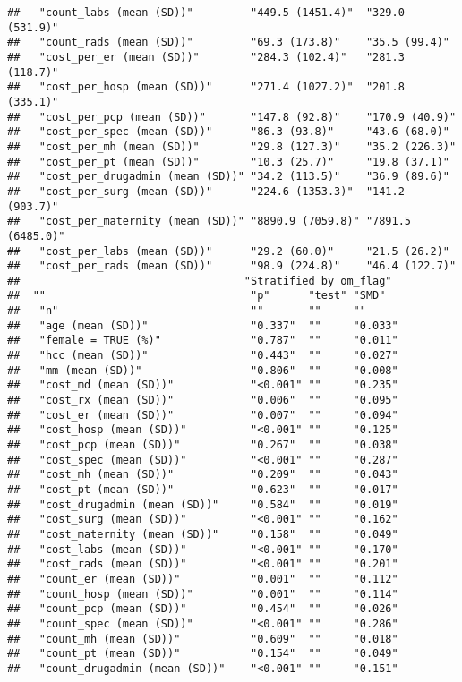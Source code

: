\documentclass[]{article}
\begin{document}
\begin{verbatim}
##   "count_labs (mean (SD))"         "449.5 (1451.4)"  "329.0 (531.9)"  
##   "count_rads (mean (SD))"         "69.3 (173.8)"    "35.5 (99.4)"    
##   "cost_per_er (mean (SD))"        "284.3 (102.4)"   "281.3 (118.7)"  
##   "cost_per_hosp (mean (SD))"      "271.4 (1027.2)"  "201.8 (335.1)"  
##   "cost_per_pcp (mean (SD))"       "147.8 (92.8)"    "170.9 (40.9)"   
##   "cost_per_spec (mean (SD))"      "86.3 (93.8)"     "43.6 (68.0)"    
##   "cost_per_mh (mean (SD))"        "29.8 (127.3)"    "35.2 (226.3)"   
##   "cost_per_pt (mean (SD))"        "10.3 (25.7)"     "19.8 (37.1)"    
##   "cost_per_drugadmin (mean (SD))" "34.2 (113.5)"    "36.9 (89.6)"    
##   "cost_per_surg (mean (SD))"      "224.6 (1353.3)"  "141.2 (903.7)"  
##   "cost_per_maternity (mean (SD))" "8890.9 (7059.8)" "7891.5 (6485.0)"
##   "cost_per_labs (mean (SD))"      "29.2 (60.0)"     "21.5 (26.2)"    
##   "cost_per_rads (mean (SD))"      "98.9 (224.8)"    "46.4 (122.7)"   
##                                   "Stratified by om_flag"
##  ""                                "p"      "test" "SMD"  
##   "n"                              ""       ""     ""     
##   "age (mean (SD))"                "0.337"  ""     "0.033"
##   "female = TRUE (%)"              "0.787"  ""     "0.011"
##   "hcc (mean (SD))"                "0.443"  ""     "0.027"
##   "mm (mean (SD))"                 "0.806"  ""     "0.008"
##   "cost_md (mean (SD))"            "<0.001" ""     "0.235"
##   "cost_rx (mean (SD))"            "0.006"  ""     "0.095"
##   "cost_er (mean (SD))"            "0.007"  ""     "0.094"
##   "cost_hosp (mean (SD))"          "<0.001" ""     "0.125"
##   "cost_pcp (mean (SD))"           "0.267"  ""     "0.038"
##   "cost_spec (mean (SD))"          "<0.001" ""     "0.287"
##   "cost_mh (mean (SD))"            "0.209"  ""     "0.043"
##   "cost_pt (mean (SD))"            "0.623"  ""     "0.017"
##   "cost_drugadmin (mean (SD))"     "0.584"  ""     "0.019"
##   "cost_surg (mean (SD))"          "<0.001" ""     "0.162"
##   "cost_maternity (mean (SD))"     "0.158"  ""     "0.049"
##   "cost_labs (mean (SD))"          "<0.001" ""     "0.170"
##   "cost_rads (mean (SD))"          "<0.001" ""     "0.201"
##   "count_er (mean (SD))"           "0.001"  ""     "0.112"
##   "count_hosp (mean (SD))"         "0.001"  ""     "0.114"
##   "count_pcp (mean (SD))"          "0.454"  ""     "0.026"
##   "count_spec (mean (SD))"         "<0.001" ""     "0.286"
##   "count_mh (mean (SD))"           "0.609"  ""     "0.018"
##   "count_pt (mean (SD))"           "0.154"  ""     "0.049"
##   "count_drugadmin (mean (SD))"    "<0.001" ""     "0.151"

\end{verbatim}
\end{document}

